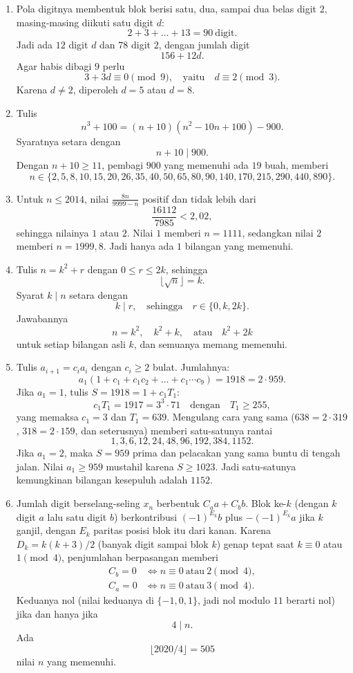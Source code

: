 \documentclass[12pt]{scrartcl}
\begin{document}
\begin{enumerate}
	\item Pola digitnya membentuk blok berisi satu, dua, sampai dua belas digit $2$,
	masing-masing diikuti satu digit $d$:
	\[ 2 + 3 + \dots + 13 = 90 \ \text{digit}. \]
	Jadi ada $12$ digit $d$ dan $78$ digit $2$,
	dengan jumlah digit
	\[ 156 + 12d. \]
	Agar habis dibagi $9$ perlu
	\[ 3 + 3d \equiv 0 \pmod{9}, \quad \text{yaitu} \quad d \equiv 2 \pmod{3}. \]
	Karena $d \ne 2$, diperoleh $d = 5$ atau $d = 8$.

	\item Tulis
	\[ n^3 + 100 = (n + 10)(n^2 - 10n + 100) - 900. \]
	Syaratnya setara dengan
	\[ n + 10 \mid 900. \]
	Dengan $n + 10 \ge 11$, pembagi $900$ yang memenuhi ada $19$ buah,
	memberi
	\[ n \in \{2, 5, 8, 10, 15, 20, 26, 35, 40, 50, 65, 80, 90, 140, 170, 215, 290, 440, 890\}. \]

	\item Untuk $n \le 2014$, nilai $\frac{8n}{9999-n}$ positif dan tidak lebih dari
	\[ \frac{16112}{7985} < 2{,}02, \]
	sehingga nilainya $1$ atau $2$.
	Nilai $1$ memberi $n = 1111$, sedangkan nilai $2$ memberi $n = 1999{,}8$.
	Jadi hanya ada $1$ bilangan yang memenuhi.

	\item Tulis $n = k^2 + r$ dengan $0 \le r \le 2k$, sehingga
	\[ \lfloor \sqrt{n} \rfloor = k. \]
	Syarat $k \mid n$ setara dengan
	\[ k \mid r, \quad \text{sehingga} \quad r \in \{0, k, 2k\}. \]
	Jawabannya
	\[ n = k^2, \quad k^2 + k, \quad \text{atau} \quad k^2 + 2k \]
	untuk setiap bilangan asli $k$, dan semuanya memang memenuhi.

	\item Tulis $a_{i+1} = c_i a_i$ dengan $c_i \ge 2$ bulat.
	Jumlahnya:
	\[ a_1(1 + c_1 + c_1c_2 + \dots + c_1\cdots c_9) = 1918 = 2 \cdot 959. \]
	Jika $a_1 = 1$, tulis $S = 1918 = 1 + c_1T_1$:
	\[ c_1T_1 = 1917 = 3^3 \cdot 71 \quad \text{dengan} \quad T_1 \ge 255, \]
	yang memaksa $c_1 = 3$ dan $T_1 = 639$.
	Mengulang cara yang sama ($638 = 2 \cdot 319$, $318 = 2 \cdot 159$, dan seterusnya)
	memberi satu-satunya rantai
	\[ 1, 3, 6, 12, 24, 48, 96, 192, 384, 1152. \]
	Jika $a_1 = 2$, maka $S = 959$ prima dan pelacakan yang sama buntu di tengah jalan.
	Nilai $a_1 \ge 959$ mustahil karena $S \ge 1023$.
	Jadi satu-satunya kemungkinan bilangan kesepuluh adalah $1152$.

	\item Jumlah digit berselang-seling $x_n$ berbentuk $C_a a + C_b b$.
	Blok ke-$k$ (dengan $k$ digit $a$ lalu satu digit $b$) berkontribusi
	$(-1)^{E_k}b$ plus $-(-1)^{E_k}a$ jika $k$ ganjil,
	dengan $E_k$ paritas posisi blok itu dari kanan.
	Karena $D_k = k(k+3)/2$ (banyak digit sampai blok $k$) genap tepat saat
	$k \equiv 0$ atau $1 \pmod{4}$, penjumlahan berpasangan memberi
	\begin{align*}
	C_b = 0 &\iff n \equiv 0 \ \text{atau} \ 2 \pmod{4}, \\
	C_a = 0 &\iff n \equiv 0 \ \text{atau} \ 3 \pmod{4}.
	\end{align*}
	Keduanya nol (nilai keduanya di $\{-1, 0, 1\}$, jadi nol modulo $11$ berarti nol)
	jika dan hanya jika
	\[ 4 \mid n. \]
	Ada
	\[ \lfloor 2020/4 \rfloor = 505 \]
	nilai $n$ yang memenuhi.
\end{enumerate}
\end{document}
